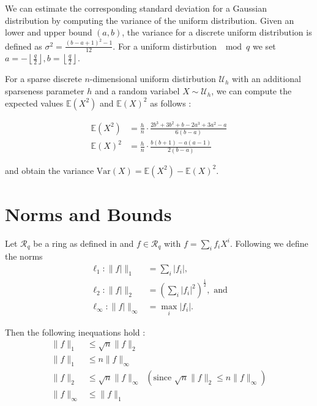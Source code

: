 We can estimate the corresponding standard deviation for a Gaussian distribution by computing the variance of the uniform distribution. Given an lower and upper bound $(a, b)$, the variance for a discrete uniform distribution is defined as $\sigma^2 = \frac{(b - a + 1)^2 - 1}{12}$. For a uniform distirbution $\mod q$ we set $a = -\left\lfloor \frac{q}{2} \right\rfloor, b = \left\lfloor \frac{q}{2} \right\rfloor$.

For a sparse discrete $n$-dimensional uniform distirbution $\mathcal{U}_h$ with an additional sparseness parameter $h$ and a random variabel $X \sim \mathcal{U}_h$, we can compute the expected values $\mathbb{E}(X^2)$ and $\mathbb{E}(X)^2$ as follows \cite{APS15}:

\begin{align}
    \mathbb{E}(X^2) & = \frac{h}{n} \cdot \frac{2b^3 + 3b^2 + b - 2a^3 + 3a^2 - a}{6(b - a)} \\
    \mathbb{E}(X)^2 & = \frac{h}{n} \cdot \frac{b (b + 1) - a(a - 1)}{2(b - a)}
\end{align}

and obtain the variance $\text{Var}(X) = \mathbb{E}(X^2) - \mathbb{E}(X)^2$.



\section{Norms and Bounds} %
Let $\mathcal{R}_q$ be a ring as defined in \cite{BDLOP18} and $f \in \mathcal{R}_q$ with $f = \sum_i f_i X^i$. Following \cite{BDLOP18} we define the norms
\begin{align}
    \ell_1 : \| f| \|_1           & = \sum_i |f_i|,                                           \\
    \ell_2 : \| f| \|_2           & = \left(\sum_i |f_i|^2\right) ^{\frac{1}{2}}, \text{ and} \\
    \ell_\infty : \| f| \|_\infty & = \max_i |f_i|.
\end{align}

Then the following inequations hold \cite{BDLOP18}:
\begin{align}
    \| f \|_1      & \leq \sqrt{n} \| f \|_2 \label{norm1}                                                                    \\
    \| f \|_1      & \leq n \| f \|_\infty \label{norm2}                                                                      \\
    \| f \|_2      & \leq \sqrt{n} \| f \|_\infty \;\;(\text{since }  \sqrt{n} \| f \|_2 \leq n \| f \|_\infty) \label{norm3} \\
    \| f \|_\infty & \leq \| f \|_1 \label{norm4}
\end{align}

